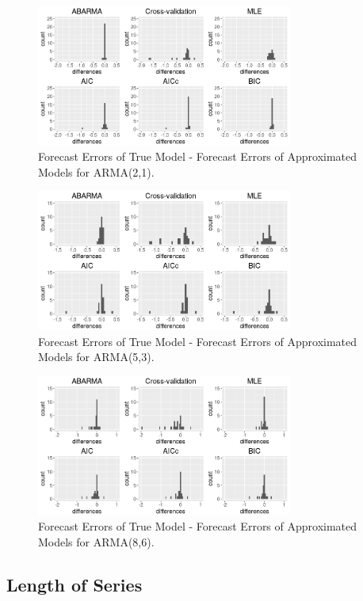 \begin{figure}
    \centering
    \includegraphics[width=3.3in]{truefore-modelfore21.png}
    \caption{Forecast Errors of True Model - Forecast Errors of Approximated Models for ARMA(2,1).}
    \label{foreplot21}
\end{figure}

\begin{figure}
    \centering
    \includegraphics[width=3.3in]{truefore-modelfore53.png}
    \caption{Forecast Errors of True Model - Forecast Errors of Approximated Models for ARMA(5,3).}
    \label{foreplot53}
\end{figure}

\begin{figure}
    \centering
    \includegraphics[width=3.3in]{truefore-modelfore86.png}
    \caption{Forecast Errors of True Model - Forecast Errors of Approximated Models for ARMA(8,6).}
    \label{foreplot86}
\end{figure}


\subsection{Length of Series}
\label{sec: length}


